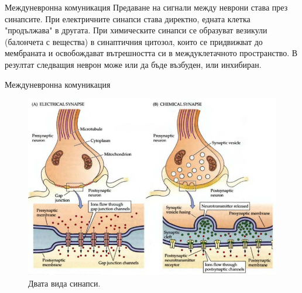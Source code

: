 \begin{frame}[t]{Междуневронна комуникация}
  Предаване на сигнали между неврони става през синапсите. 
  При електричните синапси става директно, едната клетка "продължава" в другата.
  При химическите синапси се образуват везикули (балончета с вещества) в синаптичния цитозол, 
  които се придвижват до мембраната и освобождават вътрешността си в междуклетачното пространство. 
  В резултат следващия неврон може или да бъде възбуден, или инхибиран.
\end{frame}

\begin{frame}[t]{Междуневронна комуникация}
  \begin{figure}[htbp!]
    \centering
    \includegraphics[width=\textwidth,height=0.7\textheight,keepaspectratio]{synapse-types.PNG}
    \caption{Двата вида синапси. \cite[Фиг 5.1]{Neuroscience}}
  \end{figure}
\end{frame}


